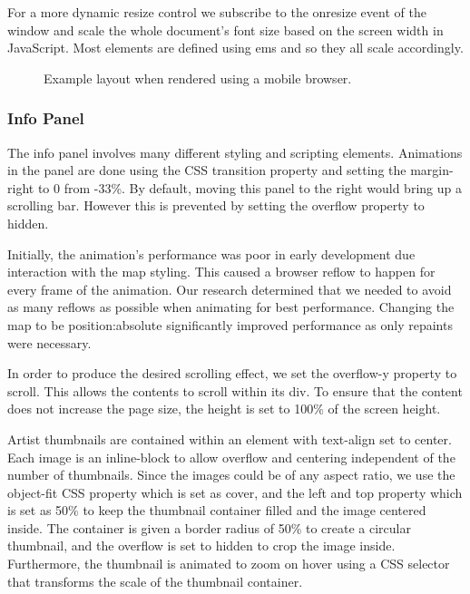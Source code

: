 \documentclass[10pt]{article}
\begin{document}
                For a more dynamic resize control we subscribe to the onresize event of the window and scale the whole document's font size based on the screen width in JavaScript. Most elements are defined using ems and so they all scale accordingly.
                \begin{figure}[!ht]
                  \centering
                  \caption{Example layout when rendered using a mobile browser.}
                \end{figure}

            \subsubsection{Info Panel}
                The info panel involves many different styling and scripting elements. Animations in the panel are done using the CSS transition property and setting the margin-right to 0 from -33\%. By default, moving this panel to the right would bring up a scrolling bar. However this is prevented by setting the overflow property to hidden.

                Initially, the animation's performance was poor in early development due interaction with the map styling. This caused a browser reflow to happen for every frame of the animation. Our research determined that we needed to avoid as many reflows as possible when animating for best performance. Changing the map to be position:absolute significantly improved performance as only repaints were necessary.

                In order to produce the desired scrolling effect, we set the overflow-y property to scroll. This allows the contents to scroll within its div. To ensure that the content does not increase the page size, the height is set to 100\% of the screen height.

                Artist thumbnails are contained within an element with text-align set to center. Each image is an inline-block to allow overflow and centering independent of the number of thumbnails. Since the images could be of any aspect ratio, we use the object-fit CSS property which is set as cover, and the left and top property which is set as 50\% to keep the thumbnail container filled and the image centered inside. The container is given a border radius of 50\% to create a circular thumbnail, and the overflow is set to hidden to crop the image inside. Furthermore, the thumbnail is animated to zoom on hover using a CSS selector that transforms the scale of the thumbnail container.
\end{document}
